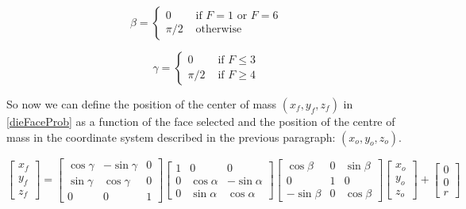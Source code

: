 \documentclass[english,12pt,a4paper,final]{article}
\begin{document}
\begin{equation*}
	\beta = \begin{cases} 
		0 & \text{ if } F = 1 \text{ or } F = 6 \\
		\pi/2 & \text{ otherwise }
	\end{cases}
\end{equation*}

\begin{equation*}
	\gamma = \begin{cases} 
		0 & \text{ if } F \le 3 \\
		\pi/2 & \text{ if } F \ge 4
	\end{cases}
\end{equation*}	

So now we can define the position of the center of mass $(x_f, y_f, z_f)$ in \eqref{dieFaceProb} as a function of the face selected and the position of the centre of mass in the coordinate system described in the previous paragraph: $(x_o, y_o, z_o)$.

\begin{equation*}
	\begin{bmatrix}
		x_f \\ y_f \\ z_f
	\end{bmatrix}
	=
	\begin{bmatrix}
		\cos\gamma & -\sin\gamma & 0 \\
		\sin\gamma & \cos\gamma & 0 \\
		0 & 0 & 1
	\end{bmatrix}
	\begin{bmatrix}
		1 & 0 & 0 \\
		0 & \cos\alpha & -\sin\alpha \\
		0 & \sin\alpha & \cos\alpha
	\end{bmatrix}
	\begin{bmatrix}
		\cos\beta & 0 & \sin\beta \\
		0 & 1 & 0 \\
		-\sin\beta & 0 & \cos\beta
	\end{bmatrix}
	\begin{bmatrix}
		x_o \\ y_o \\ z_o
	\end{bmatrix}
	 +
	 \begin{bmatrix}
	 	0 \\ 0 \\ r
	 \end{bmatrix}
\end{equation*}
\end{document}
